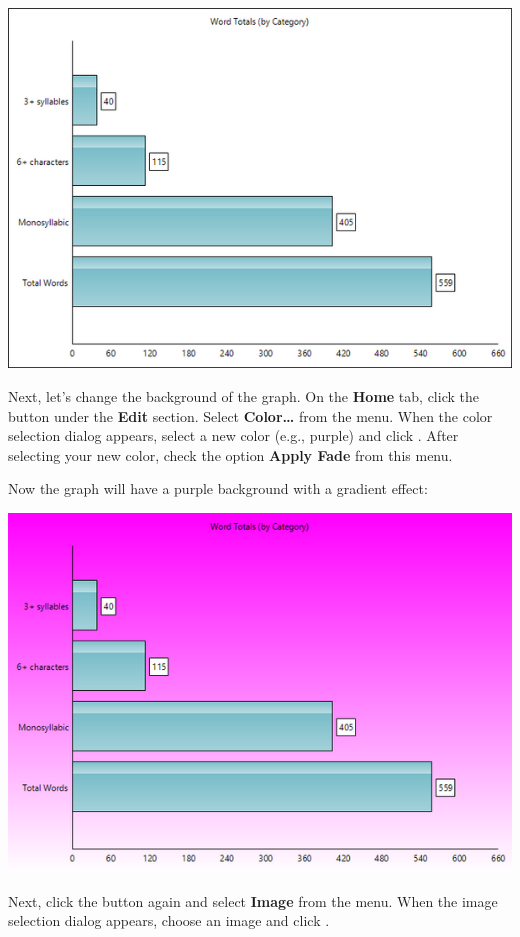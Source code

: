 \documentclass[
]{book}
\theoremstyle{definition}
\theoremstyle{definition}
\theoremstyle{definition}
\theoremstyle{definition}
\theoremstyle{remark}
\begin{document}
\includegraphics{Images/ExampleGraphSorted.png}

Next, let's change the background of the graph. On the \textbf{Home} tab, click the  button under the \textbf{Edit} section. Select \textbf{Color\ldots{}} from the menu. When the color selection dialog appears, select a new color (e.g., purple) and click . After selecting your new color, check the option \textbf{Apply Fade} from this menu.

Now the graph will have a purple background with a gradient effect:

\includegraphics{Images/ExampleGraphBackgroundColorChanged.png}

Next, click the  button again and select \textbf{Image} from the menu. When the image selection dialog appears, choose an image and click .
\end{document}
